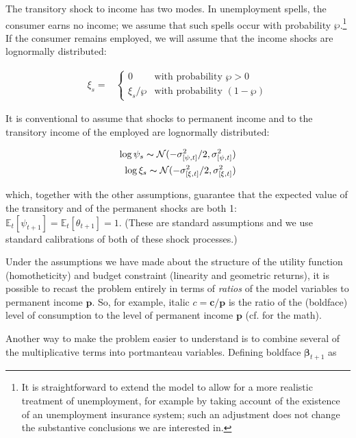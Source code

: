 \documentclass{article}
\newcommand{\pLvl}{\mathbf{p}}
\newcommand{\DiscFac}{\beta}
\newcommand{\cLvl}{\mathbf{c}}
\newcommand{\Ex}{\mathbb{E}}
\newcommand{\permShk}{\psi}
\newcommand{\pZero}{\wp}
\newcommand{\tranShkEmp}{\xi}
\newcommand{\tranShk}{\theta}
\newcommand{\cNrm}{c}
\begin{document}
The transitory shock to income has two modes. In unemployment spells, the consumer earns no income; we assume that such spells occur with probability $\pZero$.\footnote{It is straightforward to extend the model to allow for a more realistic treatment of unemployment, for example by taking account of the existence of an unemployment insurance system; such an adjustment does not change the substantive conclusions we are interested in.} If the consumer remains employed, we will assume that the income shocks are lognormally distributed:

\begin{align}
    \tranShkEmp_{s} = &
    \begin{cases}
        0\phantom{/\pZero} & \text{with probability $\pZero>0$}
        \\ \xi_{s}/\pZero & \text{with probability $(1-\pZero)$}
    \end{cases}
\end{align}

It is conventional to assume that shocks to permanent income and to the transitory income of the employed are lognormally distributed:

\begin{align}
    \log \permShk_{s} \thicksim \mathcal{N}(-\sigma_{[\permShk, t]}^{2}/2,\sigma_{[\permShk, t]}^{2})
    \\ \log \xi_{s}\thicksim \mathcal{N}(-\sigma_{[\xi, t]}^{2}/2,\sigma_{[\xi, t]}^{2})
\end{align}

which, together with the other assumptions, guarantee that the expected value of the transitory and of the permanent shocks are both 1: $\Ex_{t}[\permShk_{t+1}]=\Ex_{t}[\tranShk_{t+1}]=1$. (These are standard assumptions and we use standard calibrations of both of these shock processes.)

Under the assumptions we have made about the structure of the utility function (homotheticity) and budget constraint (linearity and geometric returns), it is possible to recast the problem entirely in terms of \textit{ratios} of the model variables to permanent income $\pLvl$. So, for example, italic $\cNrm = \cLvl/\pLvl$ is the ratio of the (boldface) level of consumption to the level of permanent income $\pLvl$ (cf. \cite{Carroll_2004} for the math).

Another way to make the problem easier to understand is to combine several of the multiplicative terms into portmanteau variables. Defining boldface $\pmb{\DiscFac}_{t+1}$ as
\end{document}
